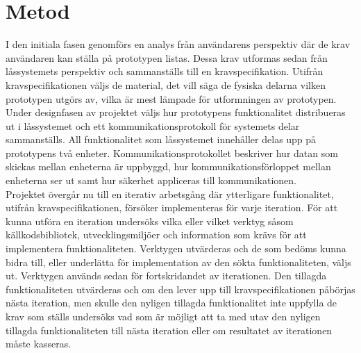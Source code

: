 \documentclass[11pt]{article}
\begin{document}
\section{Metod}
I den initiala fasen genomförs en analys från användarens perspektiv där de krav användaren kan ställa på prototypen listas. Dessa krav utformas sedan från låssystemets perspektiv och sammanställs till en kravspecifikation. Utifrån kravspecifikationen väljs de material, det vill säga de fysiska delarna vilken prototypen utgörs av, vilka är mest lämpade för utformningen av prototypen.\\
Under designfasen av projektet väljs hur prototypens funktionalitet distribueras ut i låssystemet och ett kommunikationsprotokoll för systemets delar sammanställs. All funktionalitet som låssystemet innehåller delas upp på prototypens två enheter. Kommunikationsprotokollet beskriver hur datan som skickas mellan enheterna är uppbyggd, hur kommunikationsförloppet mellan enheterna ser ut samt hur säkerhet appliceras till kommunikationen.\\
Projektet övergår nu till en iterativ arbetsgång där ytterligare funktionalitet, utifrån kravspecifikationen, försöker implementeras för varje iteration. För att kunna utföra en iteration undersöks vilka eller vilket verktyg såsom källkodsbibliotek, utvecklingsmiljöer och information som krävs för att implementera funktionaliteten. Verktygen utvärderas och de som bedöms kunna bidra till, eller underlätta för implementation av den sökta funktionaliteten, väljs ut. Verktygen används sedan för fortskridandet av iterationen. Den tillagda funktionaliteten utvärderas och om den lever upp till kravspecifikationen påbörjas nästa iteration, men skulle den nyligen tillagda funktionalitet inte uppfylla de krav som ställs undersöks vad som är möjligt att ta med utav den nyligen tillagda funktionaliteten till nästa iteration eller om resultatet av iterationen måste kasseras.
\end{document}
